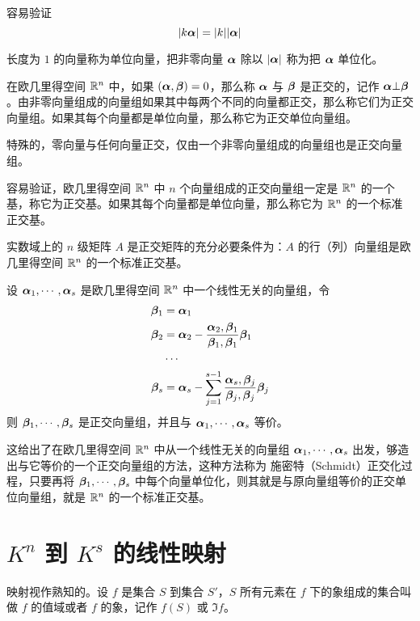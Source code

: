 容易验证
$$|k\boldsymbol{\alpha}| = |k||\boldsymbol{\alpha}|$$

长度为 $1$ 的向量称为单位向量，把非零向量 $\boldsymbol{\alpha}$ 除以 $|\boldsymbol{\alpha}|$ 称为把 $\boldsymbol{\alpha}$ 单位化。

在欧几里得空间 $\mathbb{R}^n$ 中，如果 $(\boldsymbol{\alpha},\boldsymbol{\beta})=0$，那么称 $\boldsymbol{\alpha}$ 与 $\boldsymbol{\beta}$ 是正交的，记作 $\boldsymbol{\alpha} \bot \boldsymbol{\beta}$。由非零向量组成的向量组如果其中每两个不同的向量都正交，那么称它们为正交向量组。如果其每个向量都是单位向量，那么称它为正交单位向量组。

特殊的，零向量与任何向量正交，仅由一个非零向量组成的向量组也是正交向量组。

容易验证，欧几里得空间 $\mathbb{R}^n$ 中 $n$ 个向量组成的正交向量组一定是 $\mathbb{R}^n$ 的一个基，称它为正交基。如果其每个向量都是单位向量，那么称它为 $\mathbb{R}^n$ 的一个标准正交基。

\begin{theorem}
    实数域上的 $n$ 级矩阵 $A$ 是正交矩阵的充分必要条件为：$A$ 的行（列）向量组是欧几里得空间 $\mathbb{R}^n$ 的一个标准正交基。
\end{theorem}

\begin{theorem}
    设 $\boldsymbol{\alpha}_1,\cdots,\boldsymbol{\alpha}_s$ 是欧几里得空间 $\mathbb{R}^n$ 中一个线性无关的向量组，令
    \begin{equation*}
        \begin{aligned}
            \boldsymbol{\beta}_1&=\boldsymbol{\alpha}_1\\
            \boldsymbol{\beta}_2&=\boldsymbol{\alpha}_2 - \frac{\boldsymbol{\alpha}_2,\boldsymbol{\beta}_1}{\boldsymbol{\beta}_1,\boldsymbol{\beta}_1}\boldsymbol{\beta}_1\\
            &\cdots \\
            \boldsymbol{\beta}_s &= \boldsymbol{\alpha}_s-\sum_{j=1}^{s-1}\frac{\boldsymbol{\alpha}_s,\boldsymbol{\beta}_j}{\boldsymbol{\beta}_j,\boldsymbol{\beta}_j}\boldsymbol{\beta}_j
        \end{aligned}
    \end{equation*}
    则 $\boldsymbol{\beta}_1,\cdots,\boldsymbol{\beta}_s$ 是正交向量组，并且与 $\boldsymbol{\alpha}_1,\cdots,\boldsymbol{\alpha}_s$ 等价。
\end{theorem}

这给出了在欧几里得空间 $\mathbb{R}^n$ 中从一个线性无关的向量组 $\boldsymbol{\alpha}_1,\cdots,\boldsymbol{\alpha}_s$ 出发，够造出与它等价的一个正交向量组的方法，这种方法称为 施密特（Schmidt）正交化过程，只要再将 $\boldsymbol{\beta}_1,\cdots,\boldsymbol{\beta}_s$ 中每个向量单位化，则其就是与原向量组等价的正交单位向量组，就是 $\mathbb{R}^n$ 的一个标准正交基。

\section{\texorpdfstring{$K^n$ 到 $K^s$ 的线性映射}{Kn 到 Ks 的线性映射}}

映射视作熟知的。设 $f$ 是集合 $S$ 到集合 $S'$，$S$ 所有元素在 $f$ 下的象组成的集合叫做 $f$ 的值域或者 $f$ 的象，记作 $f(S)$ 或 $\Im f$。

